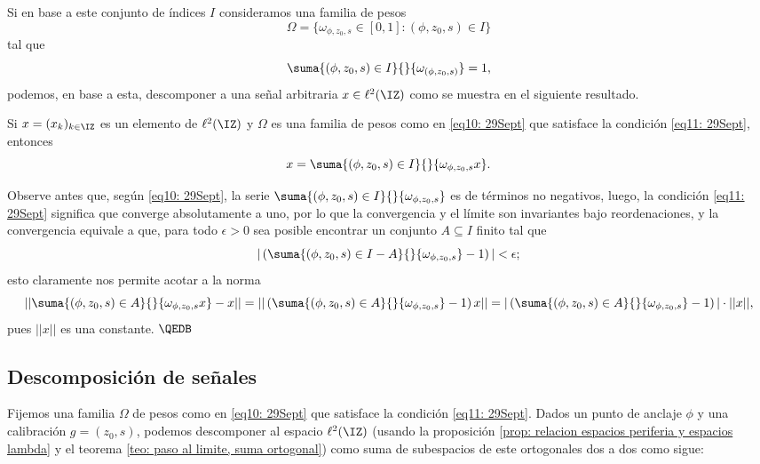 Si en base a este conjunto de índices $I$
consideramos una familia de pesos
\begin{equation}
\label{eq10: 29Sept}
\Omega=\{ \omega_{\phi, z_{0}, s} \in [0,1] : (\phi, z_{0}, s) \in I \}
\end{equation}
tal que
\begin{equation}
\label{eq11: 29Sept}
\suma{(\phi, z_{0}, s) \in I}{}{\omega_{(\phi, z_{0}, s)}}=1,
\end{equation}
podemos, en base a esta, descomponer a una señal
arbitraria $x \in \ell^{2}(\IZ)$ como se muestra
en el siguiente resultado.
\begin{prop} \label{prop: descomposicion de señal respecto a pesos}
Si $x=(x_{k})_{k \in \IZ}$ es un elemento de
$\ell^{2}(\IZ)$ y $\Omega$ es una familia de pesos como
en \eqref{eq10: 29Sept} que satisface
la condición \eqref{eq11: 29Sept}, entonces
\[
x= \suma{(\phi, z_{0}, s) \in I}{}{\omega_{\phi, z_{0}, s}x}.
\]
\end{prop}
\demostracion
Observe antes que, según \eqref{eq10: 29Sept}, la serie
$\suma{(\phi, z_{0}, s) \in I}{}{\omega_{\phi, z_{0}, s}}$
es de términos no negativos, luego,
la condición \eqref{eq11: 29Sept} significa que
converge absolutamente a uno, por lo que la convergencia
y el límite son invariantes bajo reordenaciones, y la
convergencia equivale a que, para todo $\epsilon>0$
sea posible encontrar un conjunto $A \subseteq I$
finito tal que
\[
|\left(\suma{(\phi, z_{0}, s) \in I-A}{}{\omega_{\phi, z_{0}, s} }-1 \right) |
< \epsilon;
\]
esto claramente nos permite acotar a la norma
\[
|| \suma{(\phi, z_{0}, s) \in A}{}{\omega_{\phi, z_{0}, s} x} -x||=
|| \left(\suma{(\phi, z_{0}, s) \in A}{}{\omega_{\phi, z_{0}, s} }-1 \right) x||
= |\left(\suma{(\phi, z_{0}, s) \in A}{}{\omega_{\phi, z_{0}, s} }-1 \right) |
\cdot ||x||,
\]
pues $||x||$ es una constante.
$\QEDB$
\subsection{Descomposición de señales}


Fijemos una familia
$\Omega$ de pesos como
en \eqref{eq10: 29Sept} que satisface
la condición \eqref{eq11: 29Sept}.
\noindent
Dados un punto de anclaje $\phi$ y una calibración
$g=(z_{0},s)$, podemos descomponer 
al espacio $\ell^{2}(\IZ)$
(usando la proposición
\ref{prop: relacion espacios periferia y espacios lambda}
y el 
teorema \ref{teo: paso al limite, suma ortogonal})
como suma de subespacios de 
este ortogonales dos a dos
como sigue:

